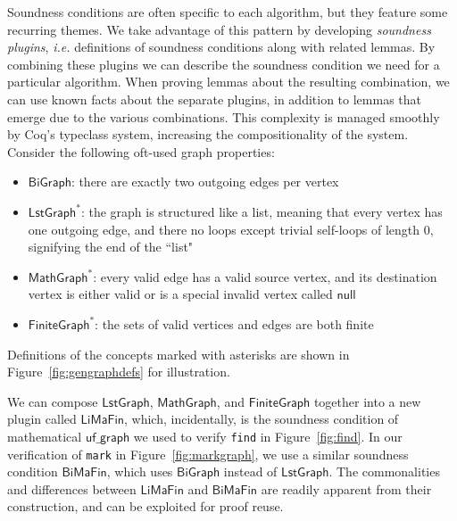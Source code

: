 \documentclass[acmsmall,screen]{acmart}
\newcommand{\li}[1]{{\texttt{\small #1}}}
\newcommand\hide[1]{}
\newcommand{\p}[1]{\ensuremath{\mathsf{#1}}} \newcommand{\m}[1]{\ensuremath{\mathit{#1}}} \newcommand{\ma}[1]{\ensuremath{\mathcal{#1}}} \let\ramify\lightning
\begin{document}
\hide{Our entire library of formal
graph theory is developed around the
three graph structures above. The theorems about the first two
are universal, while some theorems about GeneralGraph
are developed on demand because soundness conditions vary by
algorithm.}
Soundness conditions are often specific to each algorithm, but they feature some recurring themes.
We take advantage of this pattern by developing \emph{soundness plugins}, \emph{i.e.} definitions of soundness
conditions along with related lemmas.  By combining these plugins
we can describe the soundness condition we need for a particular
algorithm.  When proving lemmas about the resulting combination,
we can use known facts about the separate plugins, in addition to
lemmas that emerge due to the various combinations.  This complexity
is managed smoothly by Coq's typeclass system, increasing the
compositionality of the system.
Consider the following oft-used graph properties:

\begin{itemize}
\vspace{-1ex}
\item \p{BiGraph}: there are exactly two outgoing edges per vertex
\item $\p{LstGraph}^{*}$: the graph is structured like a list, meaning that every 
vertex has one outgoing edge, and there no loops except trivial self-loops 
of length $0$, signifying the end of the ``list"
\item $\p{MathGraph}^{*}$: every valid edge has a valid source vertex,
and its destination vertex is either valid or is a 
special invalid vertex called \p{null}
\item $\p{FiniteGraph}^{*}$: the sets of valid vertices and edges are both finite
\hide{More subtly, consider that many real data structures use special null values to
represent unused nodes.  The  property introduces this concept---
\emph{i.e.} some special invalid nodes are allowed to appear as
destinations for valid edges.} 



\end{itemize}
Definitions of the concepts marked with asterisks are
shown in Figure~\ref{fig:gengraphdefs} for illustration.
\hide{As a first step, we can prove many general, reusable lemmas
about these properties. However, these properties are still
too general to model a real program. The next step is to compose
these plugins to arrive at a more specific set of restrictions
that more closely models our particular graph.}
We can compose
\p{LstGraph}, \p{MathGraph}, and \p{FiniteGraph}
together into a new plugin called \p{LiMaFin}, which, incidentally, is
the soundness condition of mathematical \p{uf\_graph}
we used to verify \li{find} in
Figure~\ref{fig:find}.  In our verification of \li{mark} in
Figure~\ref{fig:markgraph}, we use a similar soundness condition
\p{BiMaFin}, which uses \p{BiGraph} instead of \p{LstGraph}.
The commonalities and differences between \p{LiMaFin}
and \p{BiMaFin} are readily apparent from their construction, 
and can be exploited for proof reuse.
\end{document}
